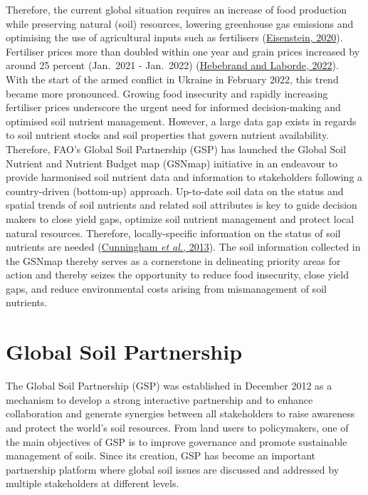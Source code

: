 \documentclass[
  10pt,
  b5paper,
  oneside]{book}
\begin{document}
Therefore, the current global situation requires an increase of food production while preserving natural (soil) resources, lowering greenhouse gas emissions and optimising the use of agricultural inputs such as fertilisers (\protect\hyperlink{ref-eisenstein2020}{Eisenstein, 2020}). Fertiliser prices more than doubled within one year and grain prices increased by around 25 percent (Jan.~2021 - Jan.~2022) (\protect\hyperlink{ref-ifpri2020}{Hebebrand and Laborde, 2022}). With the start of the armed conflict in Ukraine in February 2022, this trend became more pronounced.
Growing food insecurity and rapidly increasing fertiliser prices underscore the urgent need for informed decision-making and optimised soil nutrient management. However, a large data gap exists in regards to soil nutrient stocks and soil properties that govern nutrient availability. Therefore, FAO's Global Soil Partnership (GSP) has launched the Global Soil Nutrient and Nutrient Budget map (GSNmap) initiative in an endeavour to provide harmonised soil nutrient data and information to stakeholders following a country-driven (bottom-up) approach.
Up-to-date soil data on the status and spatial trends of soil nutrients and related soil attributes is key to guide decision makers to close yield gaps, optimize soil nutrient management and protect local natural resources. Therefore, locally-specific information on the status of soil nutrients are needed (\protect\hyperlink{ref-cunningham2013}{Cunningham \emph{et al.}, 2013}). The soil information collected in the GSNmap thereby serves as a cornerstone in delineating priority areas for action and thereby seizes the opportunity to reduce food insecurity, close yield gaps, and reduce environmental costs arising from mismanagement of soil nutrients.

\hypertarget{global-soil-partnership}{%
\section{Global Soil Partnership}\label{global-soil-partnership}}

The Global Soil Partnership (GSP) was established in December 2012 as a mechanism to develop a strong interactive partnership and to enhance collaboration and generate synergies between all stakeholders to raise awareness and protect the world's soil resources. From land users to policymakers, one of the main objectives of GSP is to improve governance and promote sustainable management of soils. Since its creation, GSP has become an important partnership platform where global soil issues are discussed and addressed by multiple stakeholders at different levels.
\end{document}
